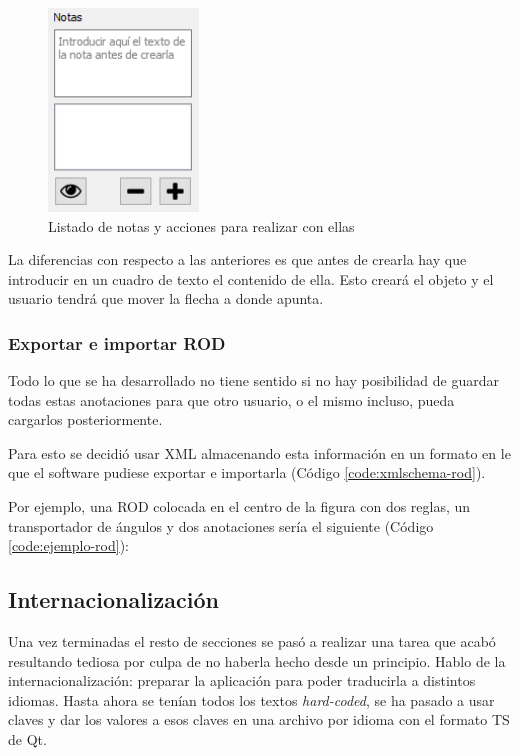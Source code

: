 \begin{figure}[H]
	\centering
	\includegraphics[width=4cm]{imagenes/desarrollo/gui-notas}
	\caption{Listado de notas y acciones para realizar con ellas}
	\label{fig:desarrollo/gui-notas}
\end{figure}

La diferencias con respecto a las anteriores es que antes de crearla hay que introducir en un cuadro de texto el contenido de ella. Esto creará el objeto y el usuario tendrá que mover la flecha a donde apunta.

\subsubsection{Exportar e importar ROD}

Todo lo que se ha desarrollado no tiene sentido si no hay posibilidad de guardar todas estas anotaciones para que otro usuario, o el mismo incluso, pueda cargarlos posteriormente.

Para esto se decidió usar XML almacenando esta información en un formato en le que el software pudiese exportar e importarla (Código \ref{code:xmlschema-rod}).



Por ejemplo, una ROD colocada en el centro de la figura con dos reglas, un transportador de ángulos y dos anotaciones sería el siguiente (Código \ref{code:ejemplo-rod}):



\subsection{Internacionalización}

Una vez terminadas el resto de secciones se pasó a realizar una tarea que acabó resultando tediosa por culpa de no haberla hecho desde un principio. Hablo de la internacionalización: preparar la aplicación para poder traducirla a distintos idiomas. Hasta ahora se tenían todos los textos \textit{hard-coded}, se ha pasado a usar claves y dar los valores a esos claves en una archivo por idioma con el formato TS de Qt.

